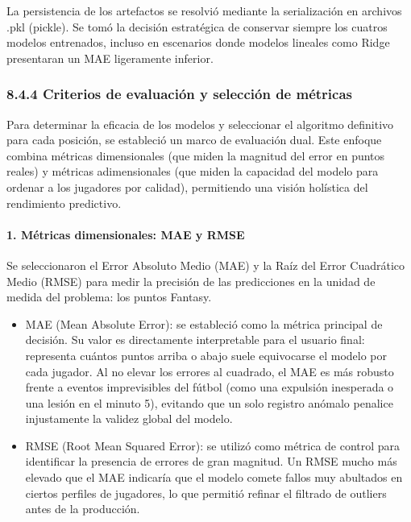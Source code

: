 La persistencia de los artefactos se resolvió mediante la serialización en archivos .pkl (pickle). Se tomó la decisión estratégica de conservar
 siempre los cuatros modelos entrenados, incluso en escenarios donde modelos lineales como Ridge presentaran
  un MAE ligeramente inferior.

\subsubsection{8.4.4 Criterios de evaluación y selección de métricas}

Para determinar la eficacia de los modelos y seleccionar el algoritmo definitivo para cada posición, se estableció un marco de evaluación dual. 
Este enfoque combina métricas dimensionales (que miden la magnitud del error en puntos reales) y métricas adimensionales (que miden la capacidad
 del modelo para ordenar a los jugadores por calidad), permitiendo una visión holística del rendimiento predictivo.

\paragraph{1. Métricas dimensionales: MAE y RMSE}

Se seleccionaron el Error Absoluto Medio (MAE) y la Raíz del Error Cuadrático Medio (RMSE) para medir la precisión de las predicciones en la unidad de medida del problema: los puntos Fantasy.

\begin{itemize}
\item MAE (Mean Absolute Error): se estableció como la métrica principal de decisión. Su valor es directamente interpretable para el usuario final:
 representa cuántos puntos arriba o abajo suele equivocarse el modelo por cada jugador. Al no elevar los errores al cuadrado, el MAE es más robusto 
 frente a eventos imprevisibles del fútbol (como una expulsión inesperada o una lesión en el minuto 5), evitando que un solo registro anómalo penalice 
 injustamente la validez global del modelo.

\item RMSE (Root Mean Squared Error): se utilizó como métrica de control para identificar la presencia de errores de gran magnitud. Un RMSE mucho más 
elevado que el MAE indicaría que el modelo comete fallos muy abultados en ciertos perfiles de jugadores, lo que permitió refinar el filtrado de outliers antes de la producción.
\end{itemize}

